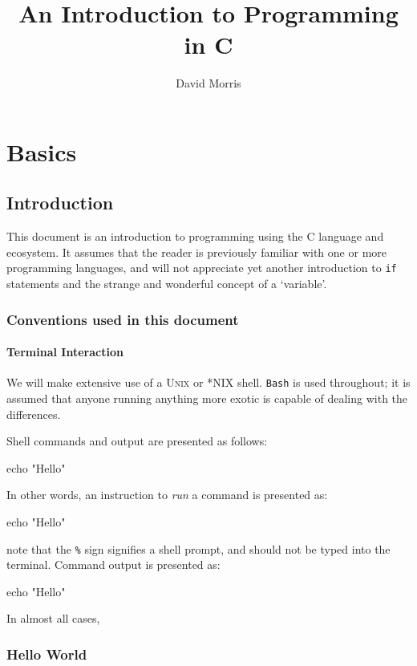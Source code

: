 \documentclass[a4paper,10pt]{report}
\title{An Introduction to Programming in C}
\author{David Morris}
\begin{document}
\maketitle

\tableofcontents

\lstlistoflistings

\part{Basics}

\chapter{Introduction}

This document is an introduction to programming using the C language
and ecosystem. It assumes that the reader is previously familiar with
one or more programming languages, and will not appreciate yet another
introduction to \texttt{if} statements and the strange and wonderful
concept of a `variable'.

\section{Conventions used in this document}

\subsection{Terminal Interaction}

We will make extensive use of a \textsc{Unix} or *NIX
shell. \texttt{Bash} is used throughout; it is assumed that anyone
running anything more exotic is capable of dealing with the
differences.

Shell commands and output are presented as follows:

echo "Hello"
\END

\noindent
In other words, an instruction to \emph{run} a command is presented
as:

\bash[script]
echo "Hello"
\END

\noindent
note that the \texttt{\%} sign signifies a shell prompt, and should
not be typed into the terminal. Command output is presented as:

\bash[stdout]
echo "Hello"
\END

\noindent
In almost all cases, 

\section{Hello World}
\end{document}

